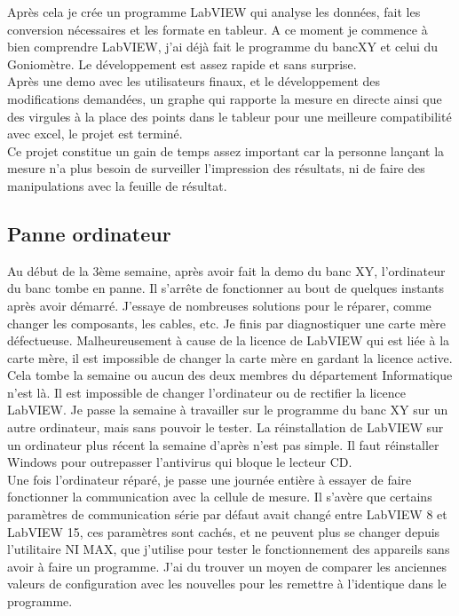 \documentclass[12pt]{article}
\begin{document}
Après cela je crée un programme LabVIEW qui analyse les données, fait les conversion nécessaires et les formate en tableur.
A ce moment je commence à bien comprendre LabVIEW, j'ai déjà fait le programme du bancXY et celui du Goniomètre.
Le développement est assez rapide et sans surprise.\\
Après une demo avec les utilisateurs finaux, et le développement des modifications demandées, un graphe qui rapporte la mesure en directe ainsi que des virgules à la place des points dans le tableur pour une meilleure compatibilité avec excel, le projet est terminé.\\
Ce projet constitue un gain de temps assez important car la personne lançant la mesure n'a plus besoin de surveiller l'impression des résultats, ni de faire des manipulations avec la feuille de résultat.
\newpage
\subsection{Panne ordinateur}

Au début de la 3ème semaine, après avoir fait la demo du banc XY, l'ordinateur du banc tombe en panne.
Il s'arrête de fonctionner au bout de quelques instants après avoir démarré.
J'essaye de nombreuses solutions pour le réparer, comme changer les composants, les cables, etc.
Je finis par diagnostiquer une carte mère défectueuse.
Malheureusement à cause de la licence de LabVIEW qui est liée à la carte mère, il est impossible de changer la carte mère en gardant la licence active.\\
Cela tombe la semaine ou aucun des deux membres du département Informatique n'est là.
Il est impossible de changer l'ordinateur ou de rectifier la licence LabVIEW.
Je passe la semaine à travailler sur le programme du banc XY sur un autre ordinateur, mais sans pouvoir le tester.
La réinstallation de LabVIEW sur un ordinateur plus récent la semaine d'après n'est pas simple.
Il faut réinstaller Windows pour outrepasser l'antivirus qui bloque le lecteur CD.\\
Une fois l'ordinateur réparé, je passe une journée entière à essayer de faire fonctionner la communication avec la cellule de mesure.
Il s'avère que certains paramètres de communication série par défaut avait changé entre LabVIEW 8 et LabVIEW 15, ces paramètres sont cachés, et ne peuvent plus se changer depuis l'utilitaire NI MAX, que j'utilise pour tester le fonctionnement des appareils sans avoir à faire un programme.
J'ai du trouver un moyen de comparer les anciennes valeurs de configuration avec les nouvelles pour les remettre à l'identique dans le programme.
\end{document}
